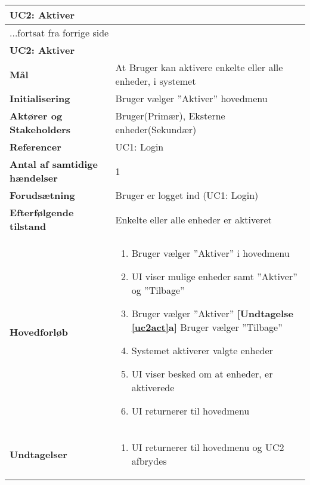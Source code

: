 \begin{center} \centering
	\begin{longtable}{|p{6cm}|p{8cm}|}
	\hline
		\multicolumn{2}{|l|}{\textbf{UC2: Aktiver}} \\\hline
		\endfirsthead
		
		\multicolumn{2}{l}{...fortsat fra forrige side} \\ \hline 
		\multicolumn{2}{|l|}{\textbf{UC2: Aktiver}} \\\hline
		\endhead	
		
		\textbf{Mål}							&At Bruger kan aktivere enkelte eller alle enheder, i systemet\\\hline
		\textbf{Initialisering}				&Bruger vælger ''Aktiver'' hovedmenu  	\\\hline
		\textbf{Aktører og Stakeholders}		&Bruger(Primær), Eksterne enheder(Sekundær) 		\\\hline
		\textbf{Referencer}					&UC1: Login					\\\hline
		\textbf{Antal af samtidige hændelser}&1 							\\\hline
		\textbf{Forudsætning}				&Bruger er logget ind (UC1: Login)\\\hline
		\textbf{Efterfølgende tilstand}		&Enkelte eller alle enheder er aktiveret  \\\hline
		\textbf{Hovedforløb}					
			&\begin{enumerate}				
					
				\item Bruger vælger ''Aktiver'' i hovedmenu
										
				\item \label{uc2menu}UI viser mulige enheder samt ''Aktiver'' og ''Tilbage''
												
				\item \label{uc2act} Bruger vælger ''Aktiver''\newline
					\textbf{[Undtagelse \ref{uc2act}a]} Bruger vælger ''Tilbage''
												
				\item \label{uc2sysact} Systemet aktiverer valgte enheder
				
				\item UI viser besked om at enheder, er aktiverede
																	
				\item UI returnerer til hovedmenu
												
			\end{enumerate}\\ \hline
		
		\textbf{Undtagelser}	
		
		&\begin{enumerate}[label= \ref{uc2act}a.]
			\item UI returnerer til hovedmenu og UC2 afbrydes
		\end{enumerate} \\\hline
											

	\end{longtable}
	\label{UC2} 
\end{center}